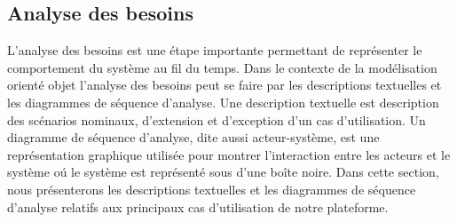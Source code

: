 \subsection{Analyse des besoins}
L'analyse des besoins est une étape importante permettant de représenter le comportement du système au fil du temps. Dans le contexte de la modélisation orienté objet l’analyse des besoins peut se faire par les descriptions textuelles et les diagrammes de séquence d'analyse. Une description textuelle est description des scénarios nominaux, d'extension et d'exception d’un cas d'utilisation. Un diagramme de séquence d'analyse, dite aussi acteur-système, est une représentation graphique utilisée pour montrer l’interaction entre les acteurs et le système oú le système est représenté sous d'une boîte noire. Dans cette section, nous présenterons les descriptions textuelles et les diagrammes de séquence d'analyse relatifs aux principaux cas d’utilisation de notre plateforme.

